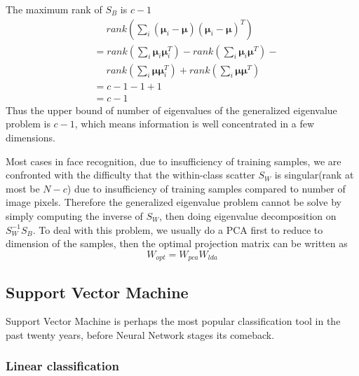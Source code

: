 \documentclass[conference]{IEEEtran}
\begin{document}
The maximum rank of $S_B$ is $c-1$
\begin{equation}
	\begin{split}
		&
		\quad\; rank(\sum_{i}(\bm{\bm{\mu}}_i -\bm{\mu})(\bm{\bm{\mu}}_i -\bm{\mu})^T) \\
		&=rank(\sum_{i}\bm{\bm{\mu}}_i\bm{\bm{\mu}}_i^T)-rank(\sum_{i}\bm{\bm{\mu}}_i\bm{\mu}^T)- \\
		&
		\quad\;rank(\sum_{i}\bm{\mu}\bm{\bm{\mu}}_i^T)+rank(\sum_{i}\bm{\mu}\bm{\mu}^T) \\
		&
		= c-1-1+1 \\
		&
		=c-1
	\end{split}
\end{equation}
Thus the upper bound of number of eigenvalues of the generalized eigenvalue problem is $c-1$, which means information is well concentrated in a few dimensions.

Most cases in face recognition, due to insufficiency of training samples, we are confronted with the difficulty that the within-class scatter $S_W$ is singular(rank at most be $N-c$) due to insufficiency of training samples compared to number of image pixels. Therefore the generalized eigenvalue problem cannot be solve by simply computing the inverse of $S_W$, then doing eigenvalue decomposition on $S_W^{-1}S_B$. To deal with this problem, we usually do a PCA first to reduce to dimension of the samples, then the optimal projection matrix can be written as
\begin{equation}
	W_{opt}=W_{pca}W_{lda}
\end{equation}
\subsection{Support Vector Machine}
Support Vector Machine is perhaps the most popular classification tool in the past twenty years, before Neural Network stages its comeback. 
\subsubsection{Linear classification}
\end{document}
